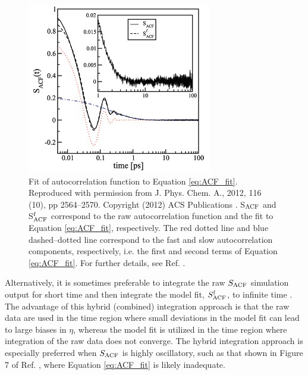 \documentclass[9pt,bestpractices]{livecoms}
\begin{document}
\begin{figure}[htb!]
	\centering
	\includegraphics[width=3.2in]{FanourgakisFig1.png}
	\caption{Fit of autocorrelation function to Equation \ref{eq:ACF_fit}. Reproduced with permission from J. Phys. Chem. A., 2012, 116 (10), pp 2564--2570. Copyright (2012) ACS Publications \cite{Fanourgakis2012}. S$_{\rm ACF}$ and S$^{\rm f}_{\rm ACF}$ correspond to the raw autocorrelation function and the fit to Equation \ref{eq:ACF_fit}, respectively. The red dotted line and blue dashed--dotted line correspond to the fast and slow autocorrelation components, respectively, i.e. the first and second terms of Equation \ref{eq:ACF_fit}. For further details, see Ref. \cite{Fanourgakis2012}.}
	\label{fig:FanourgakisFig1}
\end{figure}


Alternatively, it is sometimes preferable to integrate the raw $S_{\rm ACF}$ simulation output for short time and then integrate the model fit, $S^{\rm f}_{\rm ACF}$, to infinite time \cite{vanderSpoel1998,Shirts2013,Fernandez2005}. The advantage of this hybrid (combined) integration approach is that the raw data are used in the time region where small deviations in the model fit can lead to large biases in $\eta$, whereas the model fit is utilized in the time region where integration of the raw data does not converge. The hybrid integration approach is especially preferred when $S_{\rm ACF}$ is highly oscillatory, such as that shown in Figure 7 of Ref. \cite{Fernandez2005}, where Equation \ref{eq:ACF_fit} is likely inadequate. 
\end{document}
